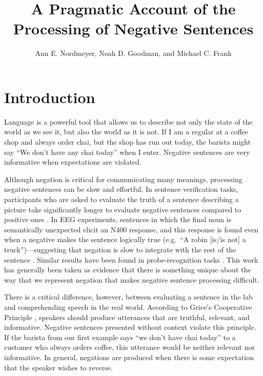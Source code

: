 \documentclass[man]{apa2}
\title{A Pragmatic Account of the Processing of Negative Sentences}
\author{Ann E. Nordmeyer, Noah D. Goodman, and Michael C. Frank}
\affiliation{Department of Psychology, Stanford University}
\begin{document}
\maketitle

\section{Introduction}

Language is a powerful tool that allows us to describe not only the state of the world as we see it, but also the world as it is not.  If I am a regular at a coffee shop and always order chai, but the shop has run out today, the barista might say ``We don't have any chai today'' when I enter.  Negative sentences are very informative when expectations are violated.

Although negation is critical for communicating many meanings, processing negative sentences can be slow and effortful.  In sentence verification tasks, participants who are asked to evaluate the truth of a sentence describing a picture take significantly longer to evaluate negative sentences compared to positive ones \cite{hclark1972, carpenter1975, just1971, just1976}. In EEG experiments, sentences in which the final noun is semantically unexpected elicit an N400 response, and this response is found even when a negative makes the sentence logically true (e.g.\ ``A robin [is/is not] a truck'')---suggesting that negation is slow to integrate with the rest of the sentence \cite{fischler1983, ludtke2008}.  Similar results have been found in probe-recognition tasks \cite{kaup2003, kaup2006, hasson2006}. This work has generally been taken as evidence that there is something unique about the way that we represent negation that makes negative sentence processing difficult.  

There is a critical difference, however, between evaluating a sentence in the lab and comprehending speech in the real world. According to Grice's Cooperative Principle \cite{grice1975}, speakers should produce utterances that are truthful, relevant, and informative.  Negative sentences presented without context violate this principle.  If the barista from our first example says ``we don't have chai today'' to a customer who always orders coffee, this utterance would be neither relevant nor informative.  In general, negations are produced when there is some expectation that the speaker wishes to reverse.  
\end{document}
